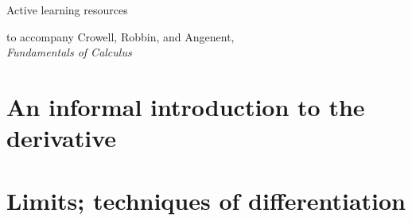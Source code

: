 \documentclass{beamer}
\begin{document}
\newcommand{\der}{\operatorname{d\!}{}}



\begin{frame}{Active learning resources}

to accompany Crowell, Robbin, and Angenent,\\
 \emph{Fundamentals of Calculus}

\end{frame}

\tableofcontents

\section{An informal introduction to the derivative}




\section{Limits; techniques of differentiation}

\end{document}
